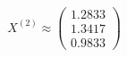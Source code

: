 \documentclass[preview]{standalone}
\begin{document}
\begin{align*}
X^{(2)} \approx \begin{pmatrix} 1.2833 \\ 1.3417 \\ 0.9833 \end{pmatrix}
\end{align*}
\end{document}
